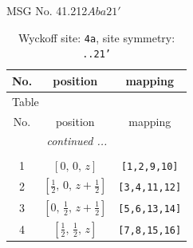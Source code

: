 \documentclass[fleqn,8pt]{jsarticle}
\begin{document}
\setcounter{MaxMatrixCols}{32}

\renewcommand{\tablename}{Table~}
\renewcommand{\figurename}{Figure~}
\begin{center}
\LARGE
MSG No. 41.212\quad$Aba21'$
\end{center}
\renewcommand{\arraystretch}{1.2}
\begin{longtable}{ccc}
\caption{Wyckoff site: {\tt 4a}, site symmetry: {\tt ..21'}}
 \\
 \hline \hline
No. & position & mapping \\ \hline \endfirsthead

\multicolumn{2}{l}{\tablename\ \thetable{}} \\
 \hline \hline
No. & position & mapping \\ \hline \endhead

 \hline \hline
\multicolumn{2}{r}{\footnotesize\it continued ...} \\ \endfoot

 \hline \hline
\multicolumn{2}{r}{} \\ \endlastfoot

1 & $\left[ 0,\, 0,\, z \right]$ & {\tt [1,2,9,10]} \\ \hline
2 & $\left[ \frac{1}{2},\, 0,\, z + \frac{1}{2} \right]$ & {\tt [3,4,11,12]} \\ \hline
3 & $\left[ 0,\, \frac{1}{2},\, z + \frac{1}{2} \right]$ & {\tt [5,6,13,14]} \\ \hline
4 & $\left[ \frac{1}{2},\, \frac{1}{2},\, z \right]$ & {\tt [7,8,15,16]} \\
\end{longtable}
\renewcommand{\arraystretch}{1.2}
\end{document}
